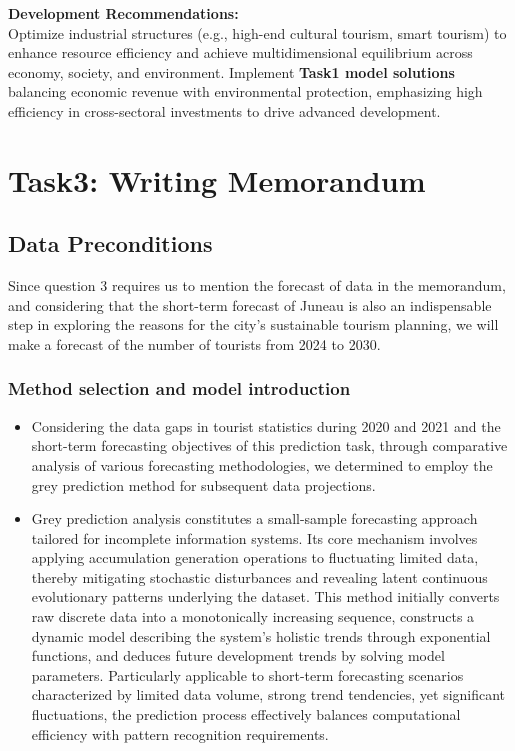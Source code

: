 \documentclass{mcmthesis}
\begin{document}
\textbf{Development Recommendations:} \\
Optimize industrial structures (e.g., high-end cultural tourism, smart tourism) to enhance resource efficiency and achieve multidimensional equilibrium across economy, society, and environment. Implement \textbf{Task1 model solutions} balancing economic revenue with environmental protection, emphasizing high efficiency in cross-sectoral investments to drive advanced development.
\section{Task3: Writing Memorandum}
\subsection{Data Preconditions}
Since question 3 requires us to mention the forecast of data in the memorandum, and considering that the short-term forecast of Juneau is also an indispensable step in exploring the reasons for the city's sustainable tourism planning, we will make a forecast of the number of tourists from 2024 to 2030.
\subsubsection*{Method selection and model introduction}
\begin{itemize}
  \item Considering the data gaps in tourist statistics during 2020 and 2021 and the short-term forecasting objectives of this prediction task, through comparative analysis of various forecasting methodologies, we determined to employ the grey prediction method for subsequent data projections.
  \item Grey prediction analysis constitutes a small-sample forecasting approach tailored for incomplete information systems. Its core mechanism involves applying accumulation generation operations to fluctuating limited data, thereby mitigating stochastic disturbances and revealing latent continuous evolutionary patterns underlying the dataset. This method initially converts raw discrete data into a monotonically increasing sequence, constructs a dynamic model describing the system's holistic trends through exponential functions, and deduces future development trends by solving model parameters. Particularly applicable to short-term forecasting scenarios characterized by limited data volume, strong trend tendencies, yet significant fluctuations, the prediction process effectively balances computational efficiency with pattern recognition requirements.
\end{itemize}
\end{document}
